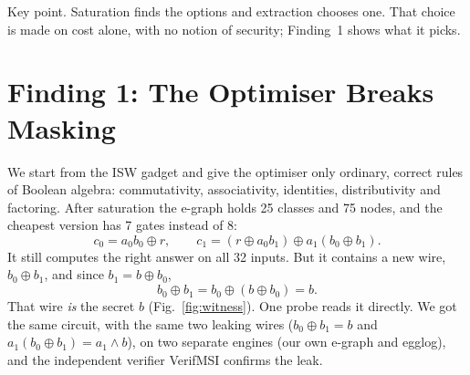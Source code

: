 \documentclass[conference]{IEEEtran}
\begin{document}
\begin{finding}{Key point.}
Saturation finds the options and extraction chooses one. That choice is made on cost alone, with no notion of security; Finding~1 shows what it picks.
\end{finding}

\section{Finding 1: The Optimiser Breaks Masking}\label{sec:rq1}
We start from the ISW gadget and give the optimiser only ordinary, correct rules of Boolean algebra: commutativity, associativity, identities, distributivity and factoring. After saturation the e-graph holds 25 classes and 75 nodes, and the cheapest version has 7 gates instead of 8:
\[
c_0=a_0b_0\oplus r,\qquad c_1=(r\oplus a_0b_1)\oplus a_1(b_0\oplus b_1).
\]
It still computes the right answer on all 32 inputs. But it contains a new wire, $b_0\oplus b_1$, and since $b_1=b\oplus b_0$,
\[
b_0\oplus b_1=b_0\oplus(b\oplus b_0)=b .
\]
That wire \emph{is} the secret $b$ (Fig.~\ref{fig:witness}). One probe reads it directly. We got the same circuit, with the same two leaking wires ($b_0\oplus b_1=b$ and $a_1(b_0\oplus b_1)=a_1\wedge b$), on two separate engines (our own e-graph and egglog), and the independent verifier VerifMSI confirms the leak.
\end{document}
